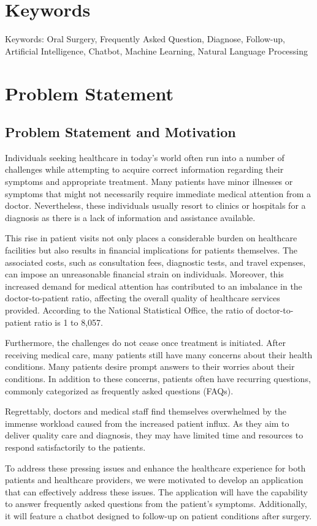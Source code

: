 \documentclass[12pt,oneside,openright,a4paper]{cpe-english-project}
\begin{document}
  \section{Keywords}
    \qquad Keywords: Oral Surgery, Frequently Asked Question, Diagnose, Follow-up, Artificial Intelligence, Chatbot, Machine Learning, Natural Language Processing

  \section{Problem Statement}
    \subsection{Problem Statement and Motivation}
      \qquad Individuals seeking healthcare in today's world often run into a number of challenges while attempting to acquire correct information regarding their symptoms and appropriate treatment. Many patients have minor illnesses or symptoms that might not necessarily require immediate medical attention from a doctor. Nevertheless, these individuals usually resort to clinics or hospitals for a diagnosis as there is a lack of information and assistance available. \par
      \qquad This rise in patient visits not only places a considerable burden on healthcare facilities but also results in financial implications for patients themselves. The associated costs, such as consultation fees, diagnostic tests, and travel expenses, can impose an unreasonable financial strain on individuals. Moreover, this increased demand for medical attention has contributed to an imbalance in the doctor-to-patient ratio, affecting the overall quality of healthcare services provided. According to the National Statistical Office, the ratio of doctor-to-patient ratio is 1 to 8,057\cite{NSODashboard}.\par
      \qquad Furthermore, the challenges do not cease once treatment is initiated. After receiving medical care, many patients still have many concerns about their health conditions. Many patients desire prompt answers to their worries about their conditions. In addition to these concerns, patients often have recurring questions, commonly categorized as frequently asked questions (FAQs).\par
      \qquad Regrettably, doctors and medical staff find themselves overwhelmed by the immense workload caused from the increased patient influx. As they aim to deliver quality care and diagnosis, they may have limited time and resources to respond satisfactorily to the patients.\par
      \qquad To address these pressing issues and enhance the healthcare experience for both patients and healthcare providers, we were motivated to develop an application that can effectively address these issues. The application will have the capability to answer frequently asked questions from the patient's symptoms. Additionally, it will feature a chatbot designed to follow-up on patient conditions after surgery.\par
\end{document}
